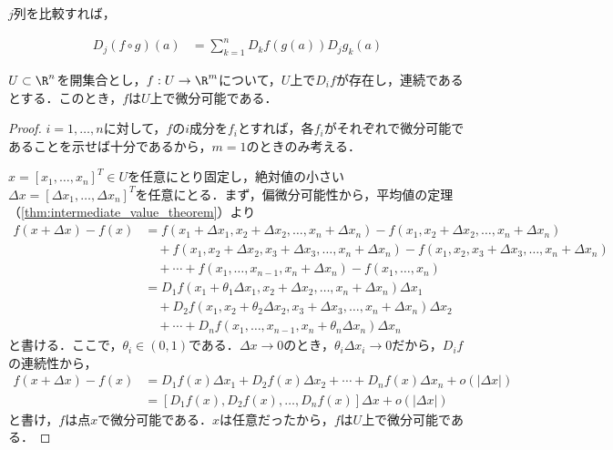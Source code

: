 \documentclass[a4paper,10pt]{ltjsarticle}
\begin{document}
\(j\)列を比較すれば，

\begin{align*}
  D_j(f\circ g)(a) & = \sum_{k=1}^n D_kf(g(a))D_jg_k(a)
\end{align*}




\begin{MyTheorem}
  \(U \subset \R^n\)を開集合とし，\(f: U \to \R^m\)について，$U$上で$D_if$が存在し，連続であるとする．このとき，\(f\)は\(U\)上で微分可能である．
\end{MyTheorem}
\begin{proof}
  \(i = 1, \dots, n\)に対して，\(f\)の\(i\)成分を\(f_i\)とすれば，各$f_i$がそれぞれで微分可能であることを示せば十分であるから，$m=1$のときのみ考える．

  \(x = [x_1, \dots, x_n]^T \in U\)を任意にとり固定し，絶対値の小さい\(\Delta x = [\Delta x_1, \dots, \Delta x_n]^T\)を任意にとる．まず，偏微分可能性から，平均値の定理（\cref{thm:intermediate_value_theorem}）より
  \begin{align*}
    f(x + \Delta x) - f(x)
    &= f(x_1+\Delta x_1,x_2+\Delta x_2,\dots,x_n+\Delta x_n)
    - f(x_1,x_2+\Delta x_2,\dots,x_n+\Delta x_n) \\
    &\quad + f(x_1,x_2+\Delta x_2,x_3+\Delta x_3,\dots,x_n+\Delta x_n) 
    - f(x_1,x_2,x_3+\Delta x_3,\dots,x_n+\Delta x_n) \\
    &\quad + \cdots + f(x_1,\dots,x_{n-1},x_n+\Delta x_n) - f(x_1,\dots,x_n) \\
    &= D_1f(x_1 + \theta_1\Delta x_1,x_2+\Delta x_2,\dots,x_n+\Delta x_n)\Delta x_1 \\
    &\quad + D_2f(x_1,x_2+\theta_2\Delta x_2,x_3+\Delta x_3,\dots,x_n+\Delta x_n)\Delta x_2\\
    &\quad + \cdots + D_n f(x_1,\dots,x_{n-1},x_n+\theta_n\Delta x_n)\Delta x_n 
  \end{align*}
  と書ける．ここで，\(\theta_i \in (0, 1)\)である．$\Delta x \to 0$のとき，$\theta_i\Delta x_i \to 0$だから，$D_if$の連続性から，
  \begin{align*}
    f(x + \Delta x) - f(x) & = D_1f(x)\Delta x_1 + D_2f(x)\Delta x_2 + \cdots + D_nf(x)\Delta x_n + o(|\Delta x|) \\
    & = [D_1f(x), D_2f(x), \dots, D_nf(x)]\Delta x + o(|\Delta x|)
  \end{align*}
  と書け，\(f\)は点\(x\)で微分可能である．$x$は任意だったから，\(f\)は\(U\)上で微分可能である．
\end{proof}
\end{document}
